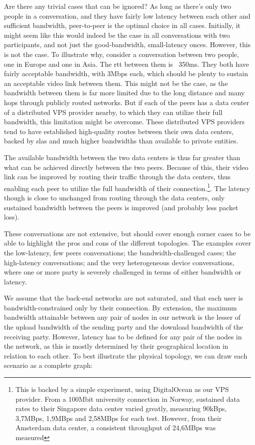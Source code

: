 Are there any trivial cases that can be ignored? As long as there's only two people in a conversation, and they have fairly low latency between each other and sufficient bandwidth, peer-to-peer is the optimal choice in all cases. Initially, it might seem like this would indeed be the case in all conversations with two participants, and not just the good-bandwidth, small-latency onces. However, this is not the case. To illustrate why, consider a conversation between two people, one in Europe and one in Asia. The \gls{rtt} between them is ~350ms. They both have fairly acceptable bandwidth, with 3Mbps each, which should be plenty to sustain an acceptable video link between them. This might not be the case, as the bandwidth between them is far more limited due to the long distance and many hops through publicly routed networks. But if each of the peers has a data center of a distributed VPS provider nearby, to which they can utilize their full bandwidth, this limitation might be overcome. These distributed VPS providers tend to have established high-quality routes between their own data centers, backed by \glspl{sla} and much higher bandwidths than available to private entities.

The available bandwidth between the two data centers is thus far greater than what can be achieved directly between the two peers. Because of this, their video link can be improved by routing their traffic through the data centers, thus enabling each peer to utilize the full bandwidth of their connection.\footnote{This is backed by a simple experiment, using DigitalOcean as our VPS provider. From a 100Mbit university connection in Norway, sustained data rates to their Singapore data center varied greatly, measuring 90kBps, 3,7MBps, 1,9MBps and 2,58MBps for each test. However, from their Amsterdam data center, a consistent throughput of 24,6MBps was measured}. The latency though is close to unchanged from routing through the data centers, only sustained bandwidth between the peers is improved (and probably less packet loss).

These conversations are not extensive, but should cover enough corner cases to be able to highlight the pros and cons of the different topologies. The examples cover the low-latency, few peers conversations; the bandwidth-challenged cases; the high-latency conversations; and the very heterogeneous device conversations, where one or more party is severely challenged in terms of either bandwidth or latency.

We assume that the back-end networks are not saturated, and that each user is bandwidth-constrained only by their connection. By extension, the maximum bandwidth attainable between any pair of nodes in our network is the lesser of the upload bandwidth of the sending party and the download bandwidth of the receiving party. However, latency has to be defined for any pair of the nodes in the network, as this is mostly determined by their geographical location in relation to each other. To best illustrate the physical topology, we can draw each scenario as a complete graph:

